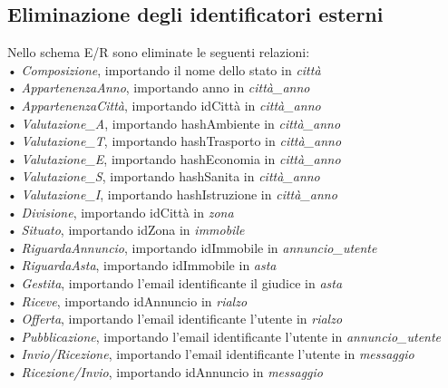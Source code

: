 \documentclass[a4paper,12pt]{report}
\begin{document}
            \subsection*{Eliminazione degli identificatori esterni}
            Nello schema E/R sono eliminate le seguenti relazioni: \\
            • \textit{Composizione}, importando il nome dello stato in \textit{città} \\
            • \textit{AppartenenzaAnno}, importando anno in \textit{città\_anno} \\
            • \textit{AppartenenzaCittà}, importando idCittà in \textit{città\_anno} \\
            • \textit{Valutazione\_A}, importando hashAmbiente in \textit{città\_anno} \\
            • \textit{Valutazione\_T}, importando hashTrasporto in \textit{città\_anno} \\
            • \textit{Valutazione\_E}, importando hashEconomia in \textit{città\_anno} \\
            • \textit{Valutazione\_S}, importando hashSanita in \textit{città\_anno} \\
            • \textit{Valutazione\_I}, importando hashIstruzione in \textit{città\_anno} \\
            • \textit{Divisione}, importando idCittà in \textit{zona} \\
            • \textit{Situato}, importando idZona in \textit{immobile} \\
            • \textit{RiguardaAnnuncio}, importando idImmobile in \textit{annuncio\_utente} \\
            • \textit{RiguardaAsta}, importando idImmobile in \textit{asta} \\
            • \textit{Gestita}, importando l'email identificante il giudice in \textit{asta} \\
            • \textit{Riceve}, importando idAnnuncio in \textit{rialzo} \\
            • \textit{Offerta}, importando l'email identificante l'utente in \textit{rialzo} \\
            • \textit{Pubblicazione}, importando l'email identificante l'utente in \textit{annuncio\_utente} \\
            • \textit{Invio/Ricezione}, importando l'email identificante l'utente in \textit{messaggio} \\
            • \textit{Ricezione/Invio}, importando idAnnuncio in \textit{messaggio} \\
\end{document}
